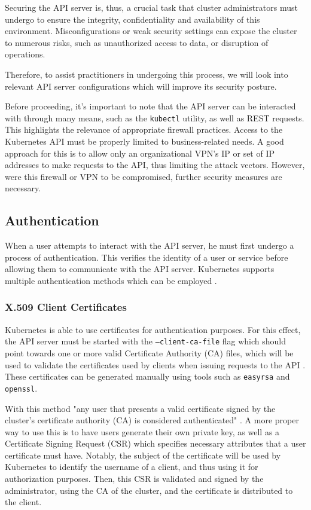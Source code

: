 \documentclass[a4paper,11pt,openright,BCOR=15mm]{scrbook}
\begin{document}
Securing the API server is, thus, a crucial task that cluster administrators must undergo to ensure the integrity, confidentiality and availability of this environment. Misconfigurations or weak security settings can expose the cluster to numerous risks, such as unauthorized access to data, or disruption of operations.

Therefore, to assist practitioners in undergoing this process, we will look into relevant API server configurations which will improve its security posture.

Before proceeding, it's important to note that the API server can be interacted with through many means, such as the \texttt{kubectl} utility, as well as REST requests. This highlights the relevance of appropriate firewall practices. Access to the Kubernetes API must be properly limited to business-related needs. A good approach for this is to allow only an organizational VPN's IP or set of IP addresses to make requests to the API, thus limiting the attack vectors. However, were this firewall or VPN to be compromised, further security measures are necessary.

\subsection{Authentication}
\label{subsec:auth}

When a user attempts to interact with the API server, he must first undergo a process of authentication. This verifies the identity of a user or service before allowing them to communicate with the API server. Kubernetes supports multiple authentication methods which can be employed \cite{the_linux_foundation_authenticating_2024}.

\subsubsection{X.509 Client Certificates}

Kubernetes is able to use certificates for authentication purposes. For this effect, the API server must be started with the \texttt{--client-ca-file} flag which should point towards one or more valid Certificate Authority (CA) files, which will be used to validate the certificates used by clients when issuing requests to the API \cite{the_linux_foundation_authenticating_2024}. These certificates can be generated manually using tools such as \texttt{easyrsa} and \texttt{openssl}.

With this method "any user that presents a valid certificate signed by the cluster's certificate authority (CA) is considered authenticated" \cite{the_linux_foundation_authenticating_2024}. A more proper way to use this is to have users generate their own private key, as well as a Certificate Signing Request (CSR) which specifies necessary attributes that a user certificate must have. Notably, the subject of the certificate will be used by Kubernetes to identify the username of a client, and thus using it for authorization purposes. Then, this CSR is validated and signed by the administrator, using the CA of the cluster, and the certificate is distributed to the client.
\end{document}
